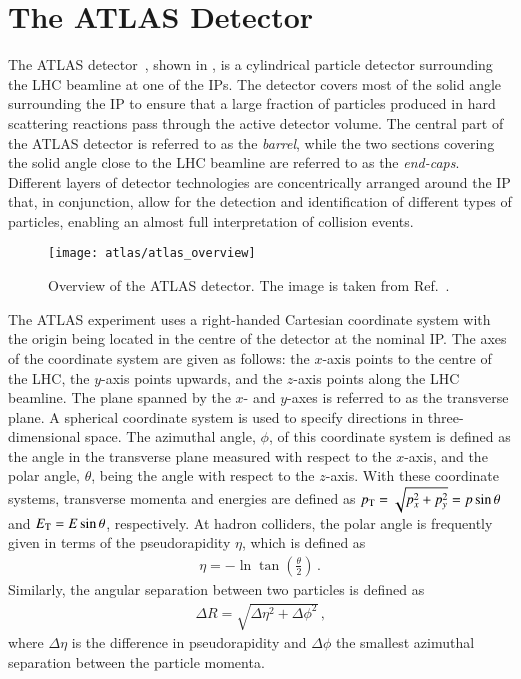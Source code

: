 \section{The ATLAS Detector}%
\label{sec:atlas}

The ATLAS detector~\cite{PERF-2007-01}, shown in
, is a cylindrical particle detector
surrounding the LHC beamline at one of the IPs. The detector covers most of the
solid angle surrounding the IP to ensure that a large fraction of particles
produced in hard scattering reactions pass through the active detector volume.
The central part of the ATLAS detector is referred to as the \emph{barrel},
while the two sections covering the solid angle close to the LHC beamline are
referred to as the \emph{end-caps}. Different layers of detector technologies
are concentrically arranged around the IP that, in conjunction, allow for the
detection and identification of different types of particles, enabling an almost
full interpretation of collision events.

\begin{figure}[htbp]
  \centering

  \texttt{[image: atlas/atlas\_overview]}

  \caption[Overview of the ATLAS detector.]{Overview of the ATLAS detector. The
    image is taken from Ref.~\cite{PERF-2007-01}.}%
  \label{fig:atlas_detector_overview}
\end{figure}

The ATLAS experiment uses a right-handed Cartesian coordinate system with the
origin being located in the centre of the detector at the nominal IP. The axes
of the coordinate system are given as follows: the $x$-axis points to the centre
of the LHC, the $y$-axis points upwards, and the $z$-axis points along the LHC
beamline. The plane spanned by the $x$- and $y$-axes is referred to as the
transverse plane. A spherical coordinate system is used to specify directions in
three-dimensional space. The azimuthal angle, $\phi$, of this coordinate system
is defined as the angle in the transverse plane measured with respect to the
$x$-axis, and the polar angle, $\theta$, being the angle with respect to the
$z$-axis. With these coordinate systems, transverse momenta and energies are
defined as $p_{\text{T}} = \sqrt{p_x^2 + p_y^2} = p \sin\theta$ and $E_{\text{T}} = E \sin\theta$,
respectively. At hadron colliders, the polar angle is frequently given in terms
of the pseudorapidity $\eta$, which is defined as
\begin{align*}
  \eta = - \ln\tan\left( \frac{\theta}{2} \right) \,\text{.}
\end{align*}
Similarly, the angular separation between two particles is defined as
\begin{align*}
  \Delta R = \sqrt{\Delta \eta^2 + \Delta \phi^2} \,\text{,}
\end{align*}
where $\Delta \eta$ is the difference in pseudorapidity and $\Delta \phi$ the
smallest azimuthal separation between the particle momenta.

